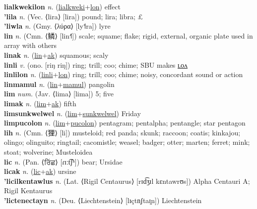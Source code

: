 \textbf{lialkwekilon} \textit{n.} (\hyperref[lialkweki]{lialkweki}+\hyperref[lon]{lon})
effect \label{lialkwekilon} \\
\textbf{'lila} \textit{n.} (Vec. ⟨lira⟩ [lira])
pound; lira; libra; \pounds \label{'lila} \\
\textbf{'liwla} \textit{n.} (Gmy. ⟨λύρα⟩ [ly˦ra])
lyre \label{'liwla} \\
\textbf{lin} \textit{n.} (Cmn. ⟨鳞⟩ [lin˧˥])
scale; squame; flake; rigid, external, organic plate used in array with others \label{lin} \\
\textbf{linak} \textit{n.} (\hyperref[lin]{lin}+\hyperref[ak]{ak})
squamous; scaly \label{linak} \\
\textbf{linli} \textit{v.} (ono. [riŋ riŋ])
ring; trill; coo; chime; SBU makes \hyperref[linlilon]{ʟᴏᴧ} \label{linli} \\
\textbf{linlilon} \textit{n.} (\hyperref[linli]{linli}+\hyperref[lon]{lon})
ring; trill; coo; chime; noisy, concordant sound or action \label{linlilon} \\
\textbf{linmamul} \textit{n.} (\hyperref[lin]{lin}+\hyperref[mamul]{mamul})
pangolin \label{linmamul} \\
\textbf{lim} \textit{num.} (Jav. ⟨lima⟩ [lima])
5; five \label{lim} \\
\textbf{limak} \textit{n.} (\hyperref[lim]{lim}+\hyperref[ak]{ak})
fifth \label{limak} \\
\textbf{limsunkwelwel} \textit{n.} (\hyperref[lim]{lim}+\hyperref[sunkwelwel]{sunkwelwel})
Friday \label{limsunkwelwel} \\
\textbf{limpucolon} \textit{n.} (\hyperref[lim]{lim}+\hyperref[pucolon]{pucolon})
pentagram; pentalpha; pentangle; star pentagon \label{limpucolon} \\
\textbf{lih} \textit{n.} (Cmn. ⟨狸⟩ [li])
musteloid; red panda; skunk; raccoon; coatis; kinkajou; olingo; olinguito; ringtail; cacomistle; weasel; badger; otter; marten; ferret; mink; stoat; wolverine; Musteloidea \label{lih} \\
\textbf{lic} \textit{n.} (Pan. ⟨ਰਿੱਛ⟩ [ɾɪːt͡ʃʰ])
bear; Ursidae \label{lic} \\
\textbf{licak} \textit{n.} (\hyperref[lic]{lic}+\hyperref[ak]{ak})
ursine \label{licak} \\
\textbf{'licilkentawlus} \textit{n.} (Lat. ⟨Rigil Centaurus⟩ [rɪd͡ʒɪl kɛntawrʊs])
Alpha Centauri A; Rigil Kentaurus \label{'licilkentawlus} \\
\textbf{'lictenectayn} \textit{n.} (Deu. ⟨Liechtenstein⟩ [lɪçtn̩ʃtaɪ̯n])
Liechtenstein \label{'lictenectayn} \\
